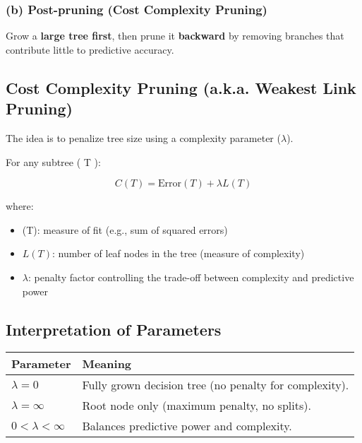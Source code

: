 \documentclass[
  letterpaper,
  DIV=11,
  numbers=noendperiod]{scrreprt}
\providecommand{\tightlist}{%
  \setlength{\itemsep}{0pt}\setlength{\parskip}{0pt}}\usepackage{longtable,booktabs,array}
\begin{document}
\subsubsection{(b) Post-pruning (Cost Complexity
Pruning)}\label{b-post-pruning-cost-complexity-pruning}

Grow a \textbf{large tree first}, then prune it \textbf{backward} by
removing branches that contribute little to predictive accuracy.

\subsection{Cost Complexity Pruning (a.k.a. Weakest Link
Pruning)}\label{cost-complexity-pruning-a.k.a.-weakest-link-pruning}

The idea is to penalize tree size using a complexity parameter
(\(\lambda\)).

For any subtree ( T ):

\[
C(T) = \text{Error}(T) + \lambda L(T)
\]

where:

\begin{itemize}
\tightlist
\item
  (T): measure of fit (e.g., sum of squared errors)\\
\item
  \(L(T)\): number of leaf nodes in the tree (measure of complexity)\\
\item
  \(\lambda\): penalty factor controlling the trade-off between
  complexity and predictive power
\end{itemize}

\subsection{Interpretation of
Parameters}\label{interpretation-of-parameters}

\begin{longtable}[]{@{}
  >{\raggedright\arraybackslash}p{}
  >{\raggedright\arraybackslash}p{}@{}}
\toprule\noalign{}
\begin{minipage}[b]{\linewidth}\raggedright
Parameter
\end{minipage} & \begin{minipage}[b]{\linewidth}\raggedright
Meaning
\end{minipage} \\
\midrule\noalign{}
\endhead
\bottomrule\noalign{}
\endlastfoot
\(\lambda = 0\) & Fully grown decision tree (no penalty for
complexity). \\
\(\lambda = \infty\) & Root node only (maximum penalty, no splits). \\
\(0 < \lambda < \infty\) & Balances predictive power and complexity. \\
\end{longtable}
\end{document}
